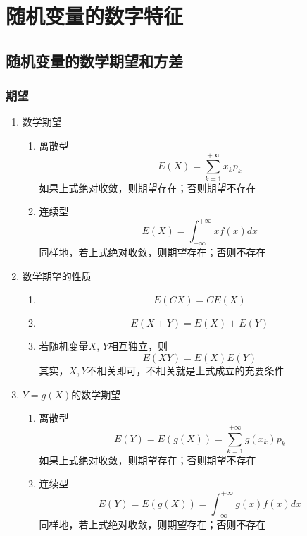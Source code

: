 \section{随机变量的数字特征}
\subsection{随机变量的数学期望和方差}
\subsubsection{期望}
\begin{enumerate}
	\item 数学期望
	\begin{enumerate}
		\item 离散型
			\begin{equation}
				E(X) = \sum_{k=1}^{+\infty}x_kp_k
			\end{equation}
			如果上式绝对收敛，则期望存在；否则期望不存在
		\item 连续型
			\begin{equation}
				E(X) = \int_{-\infty}^{+\infty}xf(x)dx
			\end{equation}
			同样地，若上式绝对收敛，则期望存在；否则不存在
	\end{enumerate}

	\item 数学期望的性质
	\begin{enumerate}
		\item 
		\begin{equation}
			E(CX) = CE(X)
		\end{equation}
		\item 
		\begin{equation}
			E(X \pm Y) = E(X) \pm E(Y)
		\end{equation}
		\item 若随机变量$X$, $Y$相互独立，则
		\begin{equation}
			E(XY) = E(X)E(Y)
		\end{equation}
		其实，$X, Y$不相关即可，不相关就是上式成立的充要条件
	\end{enumerate}

	\item $Y=g(X)$的数学期望
	\begin{enumerate}
		\item 离散型
			\begin{equation}
				E(Y) = E(g(X)) = \sum_{k=1}^{+\infty} g(x_k)p_k
			\end{equation}
			如果上式绝对收敛，则期望存在；否则期望不存在
		\item 连续型
			\begin{equation}
				E(Y) = E(g(X)) = \int_{-\infty}^{+\infty}g(x)f(x)dx
			\end{equation}
			同样地，若上式绝对收敛，则期望存在；否则不存在
	\end{enumerate}


\end{enumerate}
